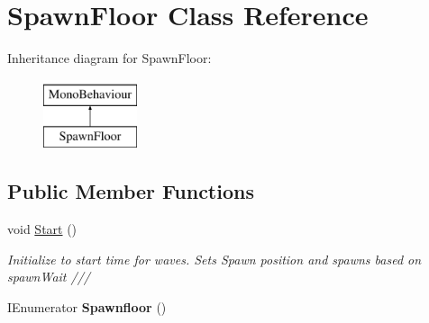 \hypertarget{classSpawnFloor}{\section{Spawn\-Floor Class Reference}
\label{classSpawnFloor}
}
Inheritance diagram for Spawn\-Floor\-:\begin{figure}[H]
\begin{center}
\leavevmode
\includegraphics[height=2.000000cm]{classSpawnFloor}
\end{center}
\end{figure}
\subsection*{Public Member Functions}
\begin{DoxyCompactItemize}
\item 
void \hyperlink{classSpawnFloor_a8d7e41eede554dac61e702a8ef4b3cc8}{Start} ()
\begin{DoxyCompactList}\small\item\em Initialize to start time for waves. Sets Spawn position and spawns based on spawn\-Wait /// \end{DoxyCompactList}\item 
\hypertarget{classSpawnFloor_aa96821e8f8bc4b44c66e93175cf6610d}{I\-Enumerator {\bfseries Spawnfloor} ()}\label{classSpawnFloor_aa96821e8f8bc4b44c66e93175cf6610d}

\end{DoxyCompactItemize}
